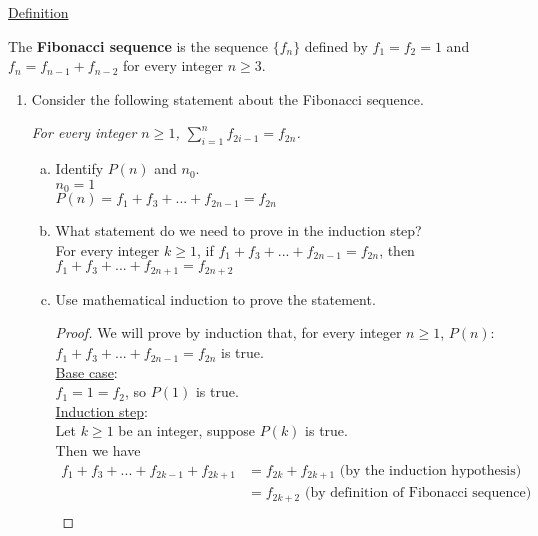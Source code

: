 \documentclass[12pt]{amsart}
\begin{document}
\newpage
\noindent
\underline{Definition}

\vspace{0.05in}
\noindent
The \textbf{Fibonacci sequence} is the sequence $\{f_{n}\}$ defined by $f_{1}=f_{2}=1$ and $f_{n}=f_{n-1}+f_{n-2}$ for every integer $n\geq 3$.

\vspace{0.3in}
\begin{enumerate}[{\bfseries 1.}]
\addtocounter{enumi}{3}
\item Consider the following statement about the Fibonacci sequence.

	\vspace{0.1in}
	\begin{center}
	\noindent
	\textit{For every integer $n\geq 1$, $\displaystyle\sum_{i=1}^{n}f_{2i-1}=f_{2n}$.}
	\end{center}

	\begin{enumerate}[(a)]
	\vspace{0.1in}
	\item Identify $P(n)$ and $n_{0}$.
		\\$n_{0} = 1$
	    \\$P(n) = f_{1} + f_{3} + ... + f_{2n - 1} = f_{2n}$

	\vspace{0.1in}
	\item What statement do we need to prove in the induction step?
		\vspace{0.1in}
    	\\For every integer $k\geq 1$, if $f_{1} + f_{3} + ... + f_{2n - 1} = f_{2n}$, then $f_{1} + f_{3} + ... + f_{2n + 1} = f_{2n+2}$

	\vspace{0.1in}
	\item Use mathematical induction to prove the statement.
		\begin{proof}
    	\vspace{0.1in}
    	We will prove by induction that, for every integer $n \geq 1$, $P(n)$: $f_{1} + f_{3} + ... + f_{2n - 1} = f_{2n}$ is true.
    	\\\underline{Base case}:
    	\\$f_1 = 1 = f_2$, so $P(1)$ is true.
    	\\\underline{Induction step}:
    	\\Let $k\geq 1$ be an integer, suppose $P(k)$ is true.
    	\\Then we have
		\begin{align*}
	    f_{1} + f_{3} + ... + f_{2k - 1} + f_{2k+1} &=  f_{2k} + f_{2k+1}\text{ (by the induction hypothesis)} \\
		&= f_{2k+2} \text{ (by definition of Fibonacci sequence)}\\
		\end{align*}
		\end{proof}
	\end{enumerate}


\end{enumerate}
\end{document}

